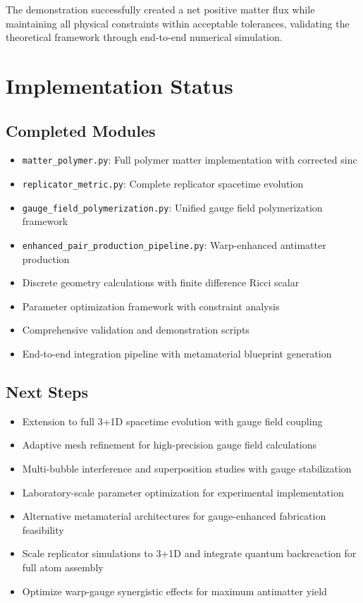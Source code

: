 \documentclass[11pt]{article}
\begin{document}
The demonstration successfully created a net positive matter flux while maintaining all physical constraints within acceptable tolerances, validating the theoretical framework through end-to-end numerical simulation.

\section{Implementation Status}

\subsection{Completed Modules}
\begin{itemize}
\item \texttt{matter\_polymer.py}: Full polymer matter implementation with corrected sinc
\item \texttt{replicator\_metric.py}: Complete replicator spacetime evolution
\item \texttt{gauge\_field\_polymerization.py}: Unified gauge field polymerization framework
\item \texttt{enhanced\_pair\_production\_pipeline.py}: Warp-enhanced antimatter production
\item Discrete geometry calculations with finite difference Ricci scalar
\item Parameter optimization framework with constraint analysis
\item Comprehensive validation and demonstration scripts
\item End-to-end integration pipeline with metamaterial blueprint generation
\end{itemize}

\subsection{Next Steps}
\begin{itemize}
\item Extension to full 3+1D spacetime evolution with gauge field coupling
\item Adaptive mesh refinement for high-precision gauge field calculations
\item Multi-bubble interference and superposition studies with gauge stabilization
\item Laboratory-scale parameter optimization for experimental implementation
\item Alternative metamaterial architectures for gauge-enhanced fabrication feasibility
\item Scale replicator simulations to 3+1D and integrate quantum backreaction for full atom assembly
\item Optimize warp-gauge synergistic effects for maximum antimatter yield
\end{itemize}
\end{document}
